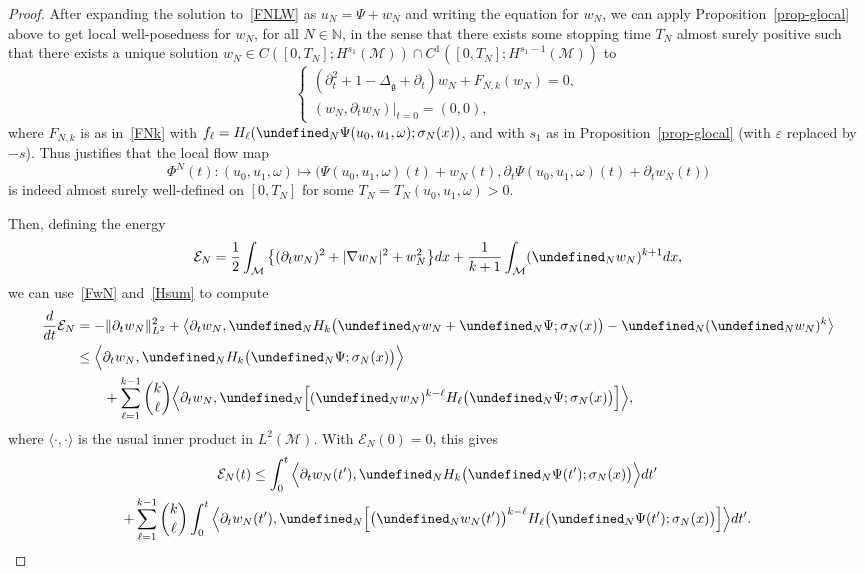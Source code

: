\documentclass[10pt]{amsart}
\theoremstyle{definition}\newtheorem{defi}[theo]{Definition}\newtheorem{rema}[theo]{Remark}\newtheorem{exam}[theo]{Example}\newtheorem{exem}[theo]{Example}\newtheorem{nota}[theo]{Notation}
\newcommand{\N}{\mathbb{N}}
\let\P= \undefined
\newcommand{\P}{\mathbf{P}}
\newcommand{\En}{\mathcal{E}}
\newcommand{\M}{\mathcal{M}}
\newcommand{\g}{\mathfrak{g}}
\newcommand{\Dlg}{\Delta_{\g}}
\newcommand{\eps}{\varepsilon}
\newcommand{\s}{\sigma}
\newcommand{\dt}{\partial_t}
\renewcommand{\o}{\omega}
\begin{document}
\begin{proof}
After expanding the solution to~\eqref{FNLW} as $u_N = \Psi + w_N$ and writing the equation for $w_N$, we can apply Proposition~\ref{prop-glocal} above to get local well-posedness for $w_N$, for all $N\in\N$, in the sense that there exists some stopping time $T_N$ almost surely positive such that there exists a unique solution $w_N\in C([0,T_N];H^{s_1}(\M))\cap C^1([0,T_N];H^{s_1-1}(\M))$ to
\begin{equation}\label{FwN}
\begin{cases}
\left(\dt^2+1-\Dlg+\dt\right)w_N + F_{N,k}(w_N)=0,\\
(w_N,\dt w_N)|_{t=0}=(0,0),
\end{cases}
\end{equation}
where $F_{N,k}$ is as in~\eqref{FNk} with $f_{\ell}=H_{\ell}(\P_N\Psi(u_0,u_1,\o);\s_N(x))$, and with $s_1$ as in Proposition~\ref{prop-glocal} (with $\eps$ replaced by $-s$). Thus justifies that the local flow map
\begin{equation*}
\Phi^N(t) : (u_0,u_1,\o) \mapsto \big(\Psi(u_0,u_1,\o)(t) + w_N(t),\dt\Psi(u_0,u_1,\o)(t) + \dt w_N(t)\big)
\end{equation*}
is indeed almost surely well-defined on $[0,T_N]$ for some $T_N=T_N(u_0,u_1,\o)>0$.

Then, defining the energy
\begin{equation*}
\En_N=\frac12\int_{\M}\big\{(\dt w_N)^2 + |\nabla w_N|^2 + w_N^2\big\}dx + \frac{1}{k+1}\int_{\M}(\P_Nw_N)^{k+1}dx,
\end{equation*}
we can use~\eqref{FwN} and~\eqref{Hsum} to compute
\begin{align*}
\frac{d}{dt}\En_N &= -\|\dt w_N\|_{L^2}^2 +\big\langle \dt w_N, \P_NH_k\big(\P_Nw_N+\P_N\Psi;\s_N(x)\big)-\P_N(\P_Nw_N)^k\big\rangle\\
&\le\Big\langle \dt w_N, \P_NH_k\big(\P_N\Psi;\s_N(x)\big)\Big\rangle\\
&\qquad+\sum_{\ell=1}^{k-1}{\binom k \ell}\Big\langle \dt w_N,\P_N\Big[(\P_Nw_N)^{k-\ell}H_{\ell}\big(\P_N\Psi;\s_N(x)\big)\Big]\Big\rangle,
\end{align*}
where $\langle \cdot,\cdot\rangle$ is the usual inner product in $L^2(\M)$. With $\En_N(0)=0$, this gives
\begin{multline}\label{En}
\En_N(t) \le \int_0^t\Big\langle \dt w_N(t'), \P_NH_k\big(\P_N\Psi(t');\s_N(x)\big)\Big\rangle dt'\\
+\sum_{\ell=1}^{k-1}{\binom k \ell}\int_0^t\Big\langle \dt w_N(t'),\P_N\Big[\big(\P_Nw_N(t')\big)^{k-\ell}H_{\ell}\big(\P_N\Psi(t');\s_N(x)\big)\Big]\Big\rangle dt'.
\end{multline}


\end{proof}
\end{document}
